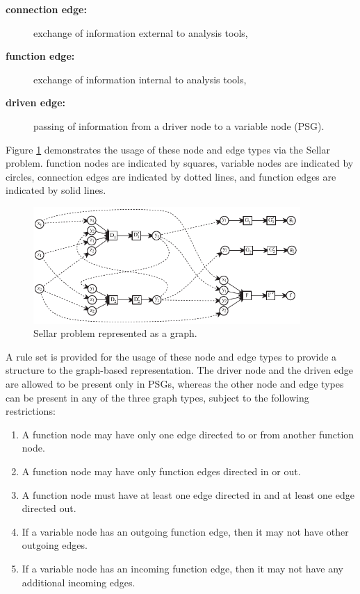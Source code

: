   \begin{description}
  \item[\bf{connection edge:}] exchange of information external to analysis tools,
  \item[\bf{function edge:}] exchange of information internal to analysis tools,
  \item[\bf{driven edge:}] passing of information from a driver node to a variable node (PSG).
  \end{description}
  Figure \ref{f:sellar types} demonstrates the usage of these node and edge 
  types via the Sellar problem. function nodes are indicated by squares, 
  variable nodes are indicated by circles, connection edges are indicated by 
  dotted lines, and function edges are indicated by solid lines.
  \begin{figure}[htb!]
    \begin{center}
      \includegraphics[width=4.0in]{images/sellar_types}
    \end{center}
    \caption{Sellar problem represented as a graph.}
  \label{f:sellar types}
  \end{figure} 

  A rule set is provided for the usage of these node and edge types to provide a structure to the graph-based representation.
  The driver node and the driven edge are allowed to be present only in PSGs, whereas the other node and edge types can be present in any of the three graph types, 
  subject to the following restrictions: 
  \begin{enumerate}
  \item A function node may have only one edge directed to or from another function node.
  \item A function node may have only function edges directed in or out.
  \item A function node must have at least one edge directed in and at least one edge 
    directed out.
  \item If a variable node has an outgoing function edge, then it may not have other outgoing edges.
  \item If a variable node has an incoming function edge, then it may not have any additional incoming edges.
  \end{enumerate}

